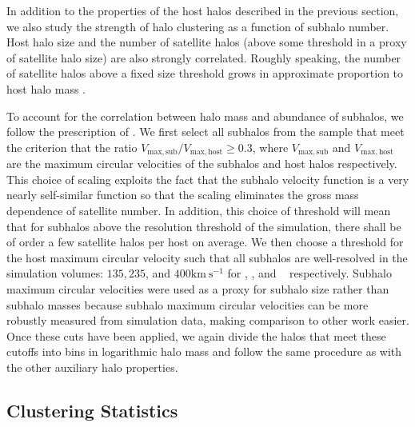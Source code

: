 \documentclass[usenatbib,fleqn]{mnras}
\begin{document}
In addition to the properties of the host halos described in the previous section, we also study the strength of halo clustering as a function of subhalo number. Host halo size and the number of satellite halos (above some threshold in a proxy of satellite halo size) 
are also strongly correlated. Roughly speaking, the number of satellite halos above a fixed size threshold grows in approximate proportion to host halo mass \citep{kravtsov_etal04, zentner_etal05}. 

To account for the correlation between halo mass and abundance of subhalos, we follow the prescription of \citet{wechsler_etal06}. We first select all subhalos from the sample
that meet the criterion that the ratio $V_{\mathrm{max,sub}}/V_{\mathrm{max,host}} \ge 0.3$, where
$V_{\mathrm{max,sub}}$ and $V_{\mathrm{max,host}}$ are the maximum circular velocities of the subhalos and host halos respectively.
This choice of scaling exploits the fact that the subhalo velocity function is a very nearly self-similar function \citep{zentner_etal05}
so that the scaling eliminates the gross mass dependence of satellite number.  
In addition, this choice of threshold will mean that for subhalos above the resolution threshold of the simulation, there shall be of order a few satellite halos per host on average. We then choose
a threshold for the host maximum circular velocity such that all subhalos are well-resolved in the simulation volumes: $135, 235$, and $400 \mathrm{km \ s^{-1}}$ for \simA, \simB, and \simC~ respectively. Subhalo maximum circular velocities were used as a proxy for subhalo size rather than subhalo masses because subhalo maximum circular velocities can be more robustly measured from simulation data, making comparison to other work easier. Once these cuts have been applied, we again divide the halos that meet these cutoffs into bins in logarithmic halo mass and follow the same procedure as with the other auxiliary halo properties. 

\subsection{Clustering Statistics}
\label{subsection:clusteringstatistics}
\end{document}
